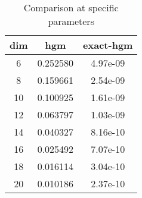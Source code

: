 \begin{table}[htbp]
\begin{center}
\begin{tabular}{ccc}
dim & hgm & exact-hgm\\
\hline
 6 & 0.252580 & 4.97e-09\\
 8 & 0.159661 & 2.54e-09\\
10 & 0.100925 & 1.61e-09\\
12 & 0.063797 & 1.03e-09\\
14 & 0.040327 & 8.16e-10\\
16 & 0.025492 & 7.07e-10\\
18 & 0.016114 & 3.04e-10\\
20 & 0.010186 & 2.37e-10\\
\hline
\end{tabular}
\end{center}
\caption{Comparison at specific parameters}
\label{tab:feller}
\end{table}

